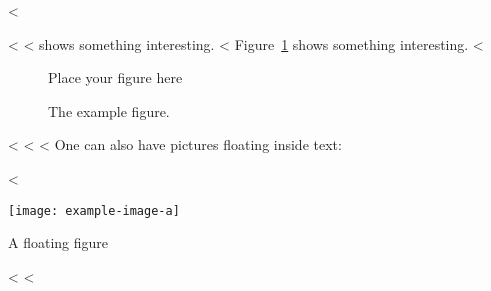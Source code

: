 <%

<%
<%
 shows something interesting.
<%
Figure~\ref{fig:label} shows something interesting.
<%

\begin{figure}
  \centering
  Place your figure here
  \caption{The example figure.}
  \label{fig:label}
\end{figure}
<%
<%
<%
One can also have pictures floating inside text:
\clearpage

<%
\begin{floatingfigure}{.33\linewidth}
\texttt{[image: example-image-a]}
\caption{A floating figure}
\end{floatingfigure}
\blindtext[2]
<%
<%
